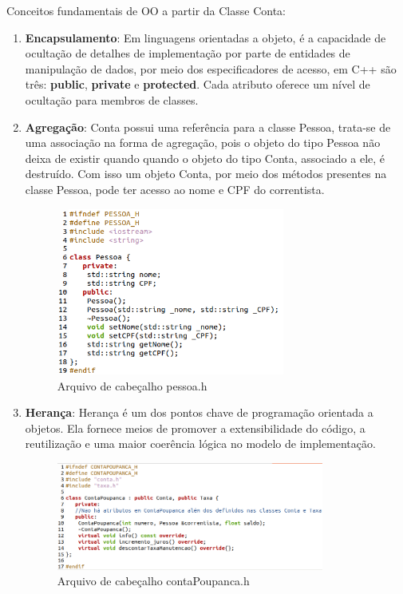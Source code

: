 \documentclass[conference]{IEEEtran}
\begin{document}
Conceitos fundamentais de OO a partir da Classe Conta:
\begin{enumerate}
    \item \textbf{Encapsulamento}: Em linguagens orientadas a objeto, é a capacidade de ocultação de detalhes de implementação por parte de entidades de manipulação de dados, por meio dos especificadores de acesso, em C++ são três: \textbf{public}, \textbf{private} e \textbf{protected}. Cada atributo oferece um nível de ocultação para membros de classes.
    \item \textbf{Agregação}: Conta possui uma referência para a classe Pessoa, trata-se de uma associação na forma de agregação, pois o objeto do tipo Pessoa não deixa de existir quando quando o objeto do tipo Conta, associado a ele, é destruído. Com isso um objeto Conta, por meio dos métodos presentes na classe Pessoa, pode ter acesso ao nome e CPF do correntista.
    \begin{figure}[htbp]
        \centering
        \includegraphics[width=7.5cm]{../img/Pessoa.png}
        \caption{Arquivo de cabeçalho pessoa.h}
        \label{fig_pessoa}
    \end{figure}
    \item \textbf{Herança}: Herança é um dos pontos chave de programação orientada a objetos. Ela fornece meios de promover a extensibilidade do código, a reutilização e uma maior coerência lógica no modelo de implementação.
    \begin{figure}[htbp]
        \centering
        \includegraphics[width=8.8cm]{../img/ContaPoupanca.png}
        \caption{Arquivo de cabeçalho contaPoupanca.h}
        \label{fig_conta}
    \end{figure}
    

\end{enumerate}
\end{document}
